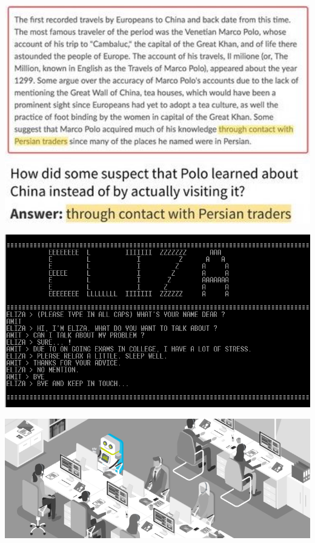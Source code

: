 \documentclass[landscape]{jhuslides3C}
\begin{document}
\vfill
\begin{center}
\includegraphics[width=20cm]{question-answering.jpeg}
\end{center}
\vfill


\vfill
\begin{center}
\includegraphics[width=25cm]{eliza.png}
\end{center}
\vfill


\vfill
\begin{center}
\includegraphics[width=25cm]{CallCenterAutomation.png}
\end{center}
\vfill
\end{document}
